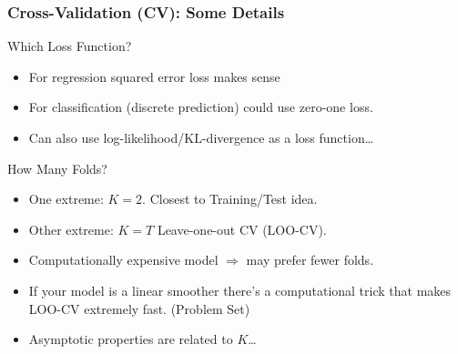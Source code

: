 \begin{frame}
  \frametitle{Cross-Validation (CV): Some Details}


  \begin{block}{Which Loss Function?}
  \small
    \vspace{-1em}
    \begin{itemize}
      \item For regression squared error loss makes sense 
      \item For classification (discrete prediction) could use zero-one loss. 
      \item Can also use log-likelihood/KL-divergence as a loss function\dots 
    \end{itemize}
  \end{block}

  

    \vspace{-1em}

  \begin{block}{How Many Folds?}
    \small
    \vspace{-1em}
    \begin{itemize}
      \item One extreme: $K=2$. Closest to Training/Test idea. 
      \item Other extreme: $K=T$ \alert{Leave-one-out} CV (LOO-CV). 
      \item Computationally expensive model $\Rightarrow$ may prefer fewer folds. 
      \item If your model is a linear smoother there's a computational trick that makes LOO-CV extremely fast. (Problem Set) 
      \item Asymptotic properties are related to $K$\dots
    \end{itemize}
    
  \end{block}

\end{frame}
